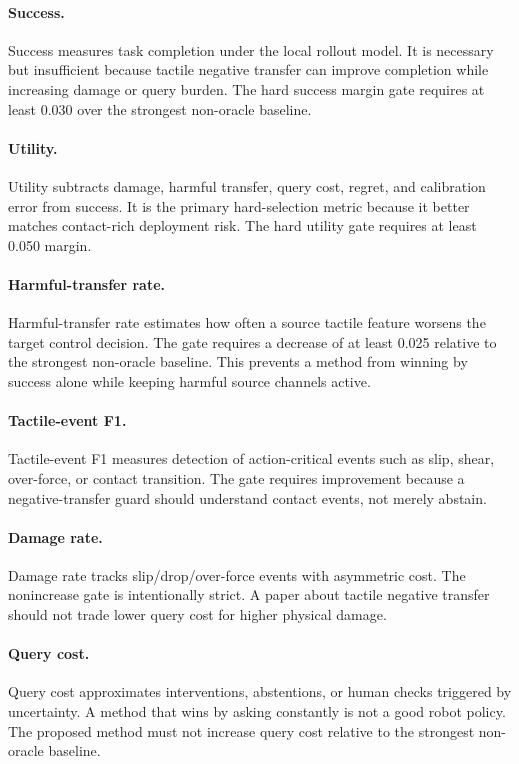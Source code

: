 \documentclass{article}
\begin{document}
\paragraph{Success.}
Success measures task completion under the local rollout model. It is necessary but insufficient because tactile negative transfer can improve completion while increasing damage or query burden. The hard success margin gate requires at least 0.030 over the strongest non-oracle baseline.

\paragraph{Utility.}
Utility subtracts damage, harmful transfer, query cost, regret, and calibration error from success. It is the primary hard-selection metric because it better matches contact-rich deployment risk. The hard utility gate requires at least 0.050 margin.

\paragraph{Harmful-transfer rate.}
Harmful-transfer rate estimates how often a source tactile feature worsens the target control decision. The gate requires a decrease of at least 0.025 relative to the strongest non-oracle baseline. This prevents a method from winning by success alone while keeping harmful source channels active.

\paragraph{Tactile-event F1.}
Tactile-event F1 measures detection of action-critical events such as slip, shear, over-force, or contact transition. The gate requires improvement because a negative-transfer guard should understand contact events, not merely abstain.

\paragraph{Damage rate.}
Damage rate tracks slip/drop/over-force events with asymmetric cost. The nonincrease gate is intentionally strict. A paper about tactile negative transfer should not trade lower query cost for higher physical damage.

\paragraph{Query cost.}
Query cost approximates interventions, abstentions, or human checks triggered by uncertainty. A method that wins by asking constantly is not a good robot policy. The proposed method must not increase query cost relative to the strongest non-oracle baseline.
\end{document}
